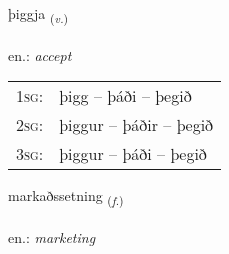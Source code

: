 \documentclass[frontgrid, backgrid]{flacards}\usepackage[]{graphicx}\usepackage[]{xcolor}
\begin{document}
\renewcommand{\flhead}{\vskip5pt \fboxsep=0pt {\small\bfseries\footnotesize Sagnorð | Verb}}
\renewcommand{\fcfoot}{\vskip5pt \fboxsep=0pt \hspace{2pt}{\small\bfseries\footnotesize 2K}}

\renewcommand{\blhead}{\vskip5pt {\small\bfseries\footnotesize Sagnorð | Verb }}
\renewcommand{\bcfoot}{\vskip5pt \hspace{2pt}{\small\bfseries\footnotesize 2K}}


{þiggja \small{\textsubscript{(\textit{v.})}} \\[1ex] %
\textphonetic{[θɪca]} \\
en.: \emph{accept} \\  [2ex]
\renewcommand*{\arraystretch}{0.8}
\begin{tabular}{p{1cm}l}
\textsc{1sg}: & þigg -- þáði -- þegið \\ 
\textsc{2sg}: & þiggur -- þáðir -- þegið \\ 
\textsc{3sg}: & þiggur -- þáði -- þegið \\ 
\end{tabular}
}

\renewcommand{\flhead}{\vskip5pt \fboxsep=0pt {\small\bfseries\footnotesize Nafnorð | Noun}}
\renewcommand{\fcfoot}{\vskip5pt \fboxsep=0pt \hspace{2pt}{\small\bfseries\footnotesize 2K}}

\renewcommand{\blhead}{\vskip5pt {\small\bfseries\footnotesize Nafnorð | Noun }}
\renewcommand{\bcfoot}{\vskip5pt \hspace{2pt}{\small\bfseries\footnotesize 2K}}


{markaðssetning \small{\textsubscript{(\textit{f.})}} \\[1ex] %
 \\
en.: \emph{marketing} \\  [2ex]
\renewcommand*{\arraystretch}{0.8}
}
\end{document}
